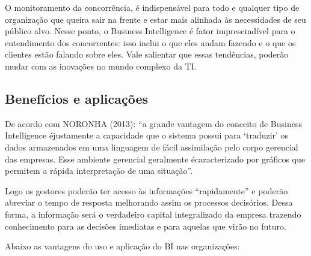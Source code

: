 O monitoramento da concorrência, \'{e} indispens\'{a}vel para todo e qualquer tipo de organiza\c{c}\~{a}o que queira sair na frente e estar mais alinhada \`{a}s necessidades de seu  público alvo. Nesse ponto, o Business Intelligence \'{e} fator imprescindível para o entendimento dos concorrentes: isso inclui o que eles andam fazendo e o que os clientes est\~{a}o falando sobre eles.
Vale salientar que essas tendências, poder\~{a}o mudar com as inova\c{c}ões no mundo complexo da TI.

\subsection{Benefícios e aplica\c{c}ões}

De acordo com NORONHA (2013): “a grande vantagem do conceito de Business Intelligence \'{e}justamente a capacidade que o sistema possui para ‘traduzir’ os dados armazenados em uma linguagem de fácil assimilação pelo corpo gerencial das empresas. Esse ambiente gerencial geralmente \'{e}caracterizado por gráficos que permitem a rápida interpretação de uma situação”.

Logo os gestores poderão ter acesso às informações “rapidamente” e poderão abreviar o tempo de resposta melhorando assim os processos decisórios. Dessa forma, a informação será o verdadeiro capital integralizado da empresa trazendo conhecimento para as decisões imediatas e para aquelas que virão no futuro.

Abaixo as vantagens do uso e aplicação do BI nas organiza\c{c}ões:

